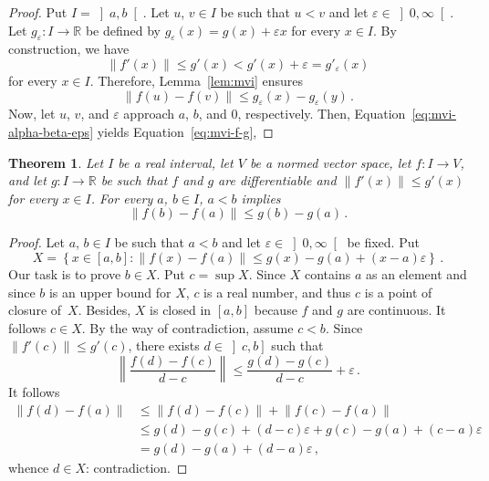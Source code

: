 \documentclass[12pt]{article}
\newcommand{\bR}{\mathbb{R}}
\newcommand{\norm}[1]{\left\| #1 \right\|}
\newcommand{\gtint}[1]{\left] #1, \infty \right[}
\newtheorem{theorem}{Theorem}
\begin{document}
\begin{proof}
  Put $I = \left]a, b \right[$.
  Let  $u$, $v \in I$ be such that $u < v$ and let  $\varepsilon \in \gtint{0}$.
  Let $g_\varepsilon \colon I \to \bR$ be defined by $g_\varepsilon(x) = g(x) + \varepsilon x$ for every $x \in I$.
  By construction, we have
  $$
  \norm{f'(x)} \le g'(x) < g'(x) + \varepsilon =  g'_\varepsilon(x)
  $$
  for every $x \in I$.
  Therefore, Lemma~\ref{lem:mvi} ensures 
  \begin{equation} \label{eq:mvi-alpha-beta-eps} 
  \norm{f(u) - f(v)} \le g_\varepsilon(x) - g_\varepsilon(y) \, .
\end{equation}
  Now, let $u$, $v$, and $\varepsilon$ approach $a$, $b$, and $0$, respectively.
  Then, Equation~\eqref{eq:mvi-alpha-beta-eps} yields Equation~\eqref{eq:mvi-f-g},
\end{proof}

\begin{theorem}
  Let $I$ be a real interval,
  let $V$ be a normed vector space,
  let $f\colon I \to V$, and let $g\colon I \to \bR$ be such that
  $f$ and $g$ are differentiable and $\norm{f'(x)} \le g'(x)$ for every $x \in I$.
  For every $a$, $b \in I$, $a < b$ implies
  $$\norm{f(b) - f(a)} \le g(b) - g(a) \, . $$
\end{theorem}

\begin{proof}
  Let $a$, $b \in I$ be such that $a < b$ and let $\varepsilon \in \gtint{0}$ be fixed.
  Put
  $$
  X = \left\{ x \in [a, b] : \norm{f(x) - f(a)}  \le g(x) - g(a) + (x - a) \varepsilon \right\} \, .
  $$
  Our task is to prove $b \in X$.
  Put $c = \sup X$.
  Since $X$ contains $a$ as an element and since $b$ is an upper bound for $X$,
  $c$ is a real number, and thus $c$ is a point of closure of~$X$.
  Besides, $X$ is closed in $[a, b]$ because $f$ and $g$ are continuous.
  It follows $c \in X$. 
  By the way of contradiction, assume $c < b$.
  Since $\norm{f'(c)} \le g'(c)$,
  there exists $d \in \left]c, b\right]$ such that
  $$
  \norm{\frac{f(d)  - f(c)}{d - c}} \le \frac{g(d) - g(c)}{d - c} + \varepsilon \, .
  $$
  It follows 
  \begin{align*}
    \norm{f(d) - f(a)}
    & \le \norm{f(d) - f(c)} + \norm{f(c) - f(a)} \\
    & \le g(d) - g(c) + (d - c) \varepsilon + g(c) - g(a) + (c - a) \varepsilon  \\
    & = g(d) - g(a) + (d - a) \varepsilon \,, 
  \end{align*}
  whence $d \in X$: contradiction.
\end{proof} 
\end{document}
